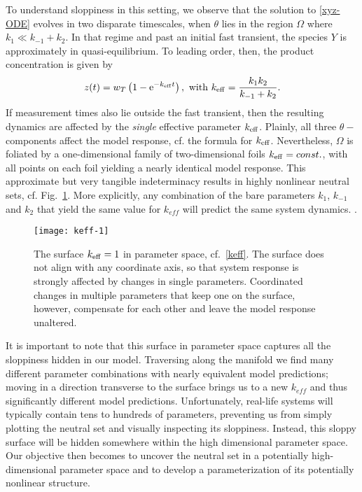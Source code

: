 \documentclass{article}
\newcommand{\ex}{{\rm e}}
\newcommand{\p}{\theta}
\begin{document}
To understand sloppiness in this setting, we observe that the solution to \eqref{xyz-ODE} evolves in two disparate timescales, when $\p$ lies in the region $\Omega$ where $k_1 \ll k_{-1}+k_2$.
In that regime and past an initial fast transient, the species $Y$ is approximately in quasi-equilibrium.
To leading order, then, the product concentration is given by
%
\begin{align}
 z(t)
=
 w_T \left(1 - \ex^{-k_{\rm eff} t}\right) ,
\ \mathrm{with} \
 k_{\rm eff} = \frac{k_1 k_2}{k_{-1} + k_2} .
\label{keff}
\end{align}
%
If measurement times also lie outside the fast transient, then the resulting dynamics are affected by the \emph{single} effective parameter $k_{\rm eff}$.
Plainly, all three $\p-$components affect the model response, cf. the formula for $k_{\rm eff}$.
Nevertheless, $\Omega$ is foliated by a one-dimensional family of two-dimensional foils $k_{\rm eff} = const.$, with all points on each foil yielding a nearly identical model response.
This approximate but very tangible indeterminacy results in highly nonlinear neutral sets, cf. Fig.~\ref{fig:qssa:sloppy-manifold}.
More explicitly, any combination of the bare parameters $k_1$, $k_{-1}$ and
$k_2$ that yield the same value for $k_{eff}$ will predict the same
system dynamics.
.

\begin{figure}[htbp]
  \centering
  \texttt{[image: keff-1]}
  \caption{The surface $k_{\rm eff} = 1$ in parameter space, cf.~\eqref{keff}. The surface does not align with any coordinate axis, so that system response is strongly affected by changes in single parameters. Coordinated changes in multiple parameters  that keep one on the surface, however, compensate for each other and leave the model response unaltered.
  \label{fig:qssa:sloppy-manifold}}
\end{figure}


It is important to note that this surface in parameter space captures
all the sloppiness hidden in our model. Traversing along the manifold we
find many different parameter combinations with nearly equivalent
model predictions; moving in a direction transverse to the surface
brings us to a new $k_{eff}$ and thus significantly different model
predictions. Unfortunately, real-life systems will typically contain
tens to hundreds of parameters, preventing us from simply plotting the
neutral set and visually inspecting its sloppiness. Instead, this
sloppy surface will be hidden somewhere within the high dimensional
parameter space. Our objective then becomes to uncover the neutral set
in a potentially high-dimensional parameter space and to develop a
parameterization of its potentially nonlinear structure. \\
\end{document}
